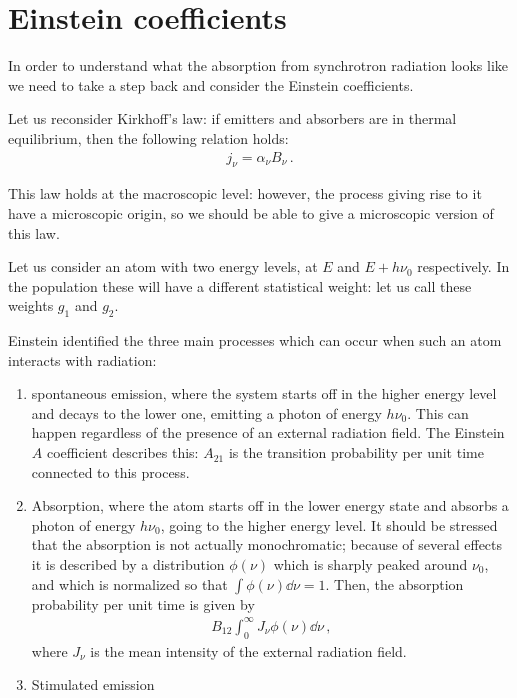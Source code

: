 \documentclass[main.tex]{subfiles}
\begin{document}
\section{Einstein coefficients}

In order to understand what the absorption from synchrotron radiation looks like we need to take a step back and consider the Einstein coefficients. 

Let us reconsider Kirkhoff's law: if emitters and absorbers are in thermal equilibrium, then the following relation holds: 
%
\begin{align}
j_\nu = \alpha _\nu B_\nu 
\,.
\end{align}

This law holds at the macroscopic level: however, the process giving rise to it have a microscopic origin, so we should be able to give a microscopic version of this law. 

Let us consider an atom with two energy levels, at \(E\) and \(E + h \nu_0\) respectively. 
In the population these will have a different statistical weight: let us call these weights \(g_1 \) and \(g_2 \). 

Einstein identified the three main processes which can occur when such an atom interacts with radiation: 
\begin{enumerate}
    \item spontaneous emission, where the system starts off in the higher energy level and decays to the lower one, emitting a photon of energy \(h \nu_0 \). This can happen regardless of the presence of an external radiation field. 
    The Einstein \(A\) coefficient describes this: \(A_{21} \) is the transition probability per unit time connected to this process. 
    \item Absorption, where the atom starts off in the lower energy state and absorbs a photon of energy \(h \nu_0 \), going to the higher energy level.
    It should be stressed that the absorption is not actually monochromatic; because of several effects it is described by a distribution \(\phi (\nu )\) which is sharply peaked around \(\nu_0\), and which is normalized so that \(\int \phi (\nu ) \dd{\nu } = 1\). 
    Then, the absorption probability per unit time is given by 
    \begin{align}
    B_{12} \int_0^{\infty } J_\nu \phi (\nu ) \dd{\nu }
    \,,
    \end{align}
    where \(J_\nu \) is the mean intensity of the external radiation field. 
    \item Stimulated emission
\end{enumerate}
\end{document}
